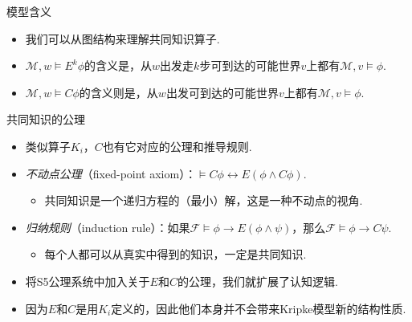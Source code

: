 \begin{frame}{模型含义}
\begin{itemize}
    \item 我们可以从图结构来理解共同知识算子.
    \item $\mathcal M,w\vDash E^k\phi$的含义是，从$w$出发走$k$步可到达的可能世界$v$上都有$\mathcal M,v\vDash \phi$.
    \item $\mathcal M,w\vDash C\phi$的含义则是，从$w$出发可到达的可能世界$v$上都有$\mathcal M,v\vDash \phi$.
\end{itemize}
\end{frame}

\begin{frame}{共同知识的公理}
\begin{itemize}
    \item 类似算子$K_i$，$C$也有它对应的公理和推导规则.
    \item \emph{不动点公理}（fixed-point axiom）：$\vDash C\phi\leftrightarrow E(\phi\wedge C\phi)$.
    \begin{itemize}
        \item 共同知识是一个递归方程的（最小）解，这是一种不动点的视角.
    \end{itemize}
    \item \emph{归纳规则}（induction rule）：如果$\mathcal F\vDash \phi\to E(\phi\wedge\psi)$，那么$\mathcal  F\vDash \phi\to C\psi$.
    \begin{itemize}
        \item 每个人都可以从真实中得到的知识，一定是共同知识.
    \end{itemize}
    \item 将S5公理系统中加入关于$E$和$C$的公理，我们就扩展了认知逻辑. 
    \item 因为$E$和$C$是用$K_i$定义的，因此他们本身并不会带来Kripke模型新的结构性质.
\end{itemize}
\end{frame}



